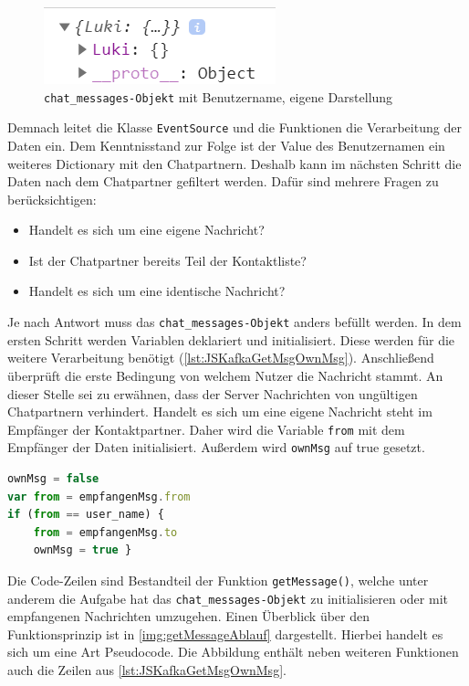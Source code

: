 \documentclass[a4paper,titlepage,halfparskip,12pt]{scrreprt}
\begin{document}
\begin{onehalfspacing}
\begin{figure}[h]
	\centering
	\includegraphics[scale=1.5]{images/Chat_messageObjectCreate}
	\caption{\texttt{chat\_messages-Objekt} mit Benutzername, eigene Darstellung}
	\label{img:Chat_messageObjectCreate}
\end{figure}
Demnach leitet die Klasse \texttt{EventSource} und die Funktionen die Verarbeitung der Daten ein. 
Dem Kenntnisstand zur Folge ist der Value des Benutzernamen ein weiteres Dictionary mit den Chatpartnern. Deshalb kann im nächsten Schritt die Daten nach dem Chatpartner gefiltert werden. Dafür sind mehrere Fragen zu berücksichtigen:
\begin{itemize}
	\item Handelt es sich um eine eigene Nachricht?
	\item Ist der Chatpartner bereits Teil der Kontaktliste?
	\item Handelt es sich um eine identische Nachricht?
\end{itemize}
Je nach Antwort muss das \texttt{chat\_messages-Objekt} anders befüllt werden. In dem ersten Schritt werden Variablen deklariert und initialisiert. Diese werden für die weitere Verarbeitung benötigt (\autoref{lst:JSKafkaGetMsgOwnMsg}). Anschließend überprüft die erste Bedingung von welchem Nutzer die Nachricht stammt. An dieser Stelle sei zu erwähnen, dass der Server Nachrichten von ungültigen Chatpartnern verhindert. Handelt es sich um eine eigene Nachricht steht im Empfänger der Kontaktpartner. Daher wird die Variable \texttt{from} mit dem Empfänger der Daten initialisiert. Außerdem wird \texttt{ownMsg} auf true gesetzt. 
\begin{lstlisting}[language=Javascript,caption=Abfrage nach der eigenen Nachricht,label={lst:JSKafkaGetMsgOwnMsg}]
ownMsg = false
var from = empfangenMsg.from
if (from == user_name) {
	from = empfangenMsg.to
	ownMsg = true }
\end{lstlisting}
Die Code-Zeilen sind Bestandteil der Funktion \texttt{getMessage()}, welche unter anderem die Aufgabe hat das \texttt{chat\_messages-Objekt} zu initialisieren oder mit empfangenen Nachrichten umzugehen. Einen Überblick über den Funktionsprinzip ist in \autoref{img:getMessageAblauf} dargestellt. Hierbei handelt es sich um eine Art Pseudocode. Die Abbildung enthält neben weiteren Funktionen auch die Zeilen aus \autoref{lst:JSKafkaGetMsgOwnMsg}.

\end{onehalfspacing}
\end{document}
